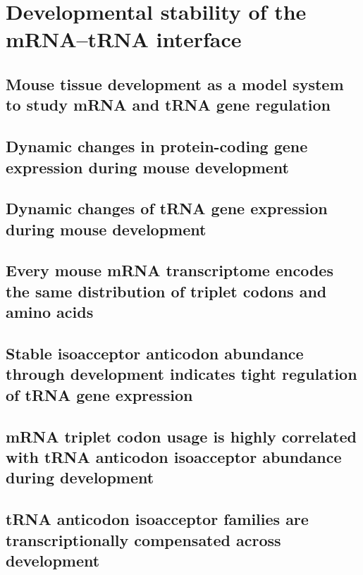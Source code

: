 \chapter{Developmental stability of the mRNA–tRNA interface}

\section{Mouse tissue development as a model system to study mRNA and tRNA gene
regulation}

\section{Dynamic changes in protein-coding gene expression during mouse
development}

\section{Dynamic changes of tRNA gene expression during mouse development}

\section{Every mouse mRNA transcriptome encodes the same distribution of
triplet codons and amino acids}

\section{Stable isoacceptor anticodon abundance through development indicates
tight regulation of tRNA gene expression}

\section{mRNA triplet codon usage is highly correlated with tRNA anticodon
isoacceptor abundance during development}

\section{tRNA anticodon isoacceptor families are transcriptionally compensated
across development}

